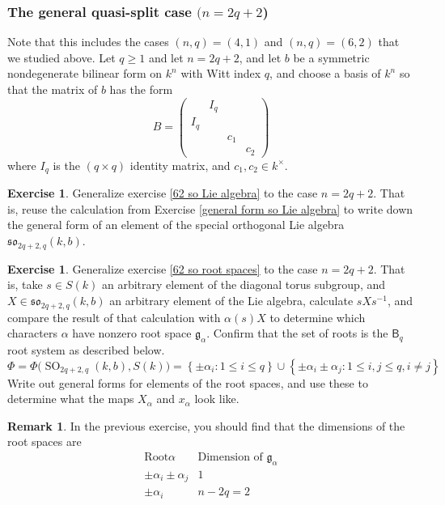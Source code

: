 \documentclass[12pt]{article}
\theoremstyle{definition}
\newtheorem{remark}[theorem]{Remark}
\newtheorem{exercise}[theorem]{Exercise}
\newcommand{\lb}{\left\{}
\newcommand{\rb}{\right\}}
\newcommand{\inv}{^{-1}}
\newcommand{\frakg}{\mathfrak{g}}
\newcommand{\frakso}{\mathfrak{so}}
\DeclareMathOperator{\SO}{SO}
\begin{document}
\subsubsection{The general quasi-split case $(n=2q+2$)}
\label{so quasi split}

Note that this includes the cases $(n,q) = (4,1)$ and $(n,q) = (6,2)$ that we studied above. Let $q \ge 1$ and let $n = 2q+2$, and let $b$ be a symmetric nondegenerate bilinear form on $k^n$ with Witt index $q$, and choose a basis of $k^n$ so that the matrix of $b$ has the form
\[
	B = 
	\begin{pmatrix}
		& I_q \\
		I_q \\
		&& c_1 \\
		&&& c_2
	\end{pmatrix}
\]
where $I_q$ is the $(q \times q)$ identity matrix, and $c_1, c_2 \in k^\times$.

\begin{exercise}
\label{quasi split so Lie algebra}
Generalize exercise \ref{62 so Lie algebra} to the case $n=2q+2$. That is, reuse the calculation from Exercise \ref{general form so Lie algebra} to write down the general form of an element of the special orthogonal Lie algebra $\frakso_{2q+2,q}(k,b)$.
\end{exercise}

\begin{exercise}
\label{quasi split so root spaces}
Generalize exercise \ref{62 so root spaces} to the case $n=2q+2$. That is, take $s \in S(k)$ an arbitrary element of the diagonal torus subgroup, and $X \in \frakso_{2q+2,q}(k,b)$ an arbitrary element of the Lie algebra, calculate $sXs \inv$, and compare the result of that calculation with $\alpha(s) X$ to determine which characters $\alpha$ have nonzero root space $\frakg_\alpha$. Confirm that the set of roots is the $\mathsf{B}_q$ root system as described below.
\[
	\Phi = \Phi \Big( \SO_{2q+2,q}(k,b), S(k) \Big) = \lb \pm \alpha_i : 1 \le i \le q \rb \cup \lb \pm \alpha_i \pm \alpha_j : 1 \le i,j \le q, i \neq j \rb
\]
Write out general forms for elements of the root spaces, and use these to determine what the maps $X_\alpha$ and $x_\alpha$ look like.
\end{exercise}

\begin{remark}
In the previous exercise, you should find that the dimensions of the root spaces are
\[
	\begin{array}{c|c}
		\text{Root} \alpha & \text{Dimension of } \frakg_\alpha \\
		\hline
		\pm \alpha_i \pm \alpha_j & 1 \\
		\pm \alpha_i & n-2q = 2
	\end{array}
\]
\end{remark}
\end{document}
